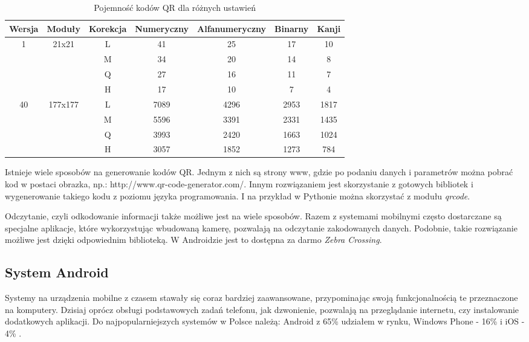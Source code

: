 \begin{table}[h]
	\caption{Pojemność kodów QR dla różnych ustawień}
	\vspace{0.3cm}
	\begin{center}
		\begin{tabular}{| c | c | c | c | c | c | c |}
			\hline
			Wersja & Moduły & Korekcja & Numeryczny & Alfanumeryczny & Binarny & Kanji\\
			\hline
			\multirow{4}{*}{1} & \multirow{4}{*}{21x21}&L&41&25&17&10\\
			& & M&34&20&14&8\\
			& & Q&27&16&11&7\\
			& & H&17&10&7&4\\
			\hline
			\multirow{4}{*}{40} & \multirow{4}{*}{177x177}&L&7089&4296&2953&1817\\
			& & M&5596&3391&2331&1435\\
			& & Q&3993&2420&1663&1024\\
			& & H&3057&1852&1273&784\\
			\hline
		\end{tabular}
	\end{center}
\end{table}
Istnieje wiele sposobów na generowanie kodów QR. Jednym z nich są strony www, gdzie po podaniu danych i parametrów można pobrać kod w postaci obrazka, np.: http://www.qr-code-generator.com/. Innym rozwiązaniem jest skorzystanie z gotowych bibliotek i wygenerowanie takiego kodu z poziomu języka programowania. I na przykład w Pythonie można skorzystać z modułu \textit{qrcode}.

Odczytanie, czyli odkodowanie informacji także możliwe jest na wiele sposobów. Razem z systemami mobilnymi często dostarczane są specjalne aplikacje, które wykorzystując wbudowaną kamerę, pozwalają na odczytanie zakodowanych danych. Podobnie, takie rozwiązanie możliwe jest dzięki odpowiednim biblioteką. W Androidzie jest to dostępna za darmo \textit{Zebra Crossing}.


\subsection{System Android}
Systemy na urządzenia mobilne z czasem stawały się coraz bardziej zaawansowane, przypominając swoją funkcjonalnością te przeznaczone na komputery. Dzisiaj oprócz obsługi podstawowych zadań telefonu, jak dzwonienie, pozwalają na przeglądanie internetu, czy instalowanie dodatkowych aplikacji. Do najpopularniejszych systemów w Polsce należą: Android z 65\% udziałem w rynku, Windows Phone - 16\% i iOS - 4\% \cite{polska_jest_mobi}.


